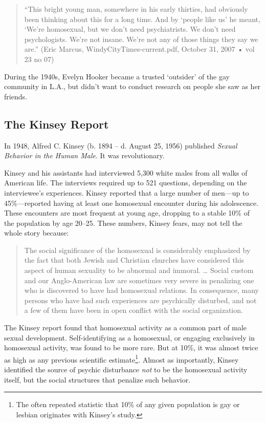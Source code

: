 \begin{refsection}
\begin{quote}

“This bright young man, somewhere in his early thirties, had obviously been thinking about this for a long time. And by ‘people like us’ he meant, ‘We’re homosexual, but we don’t need psychiatrists. We don’t need psychologists. We’re not insane. We’re not any of those things they say we are.” (Eric Marcus, WindyCityTimes-current.pdf, October 31, 2007 • vol 23 no 07)
\end{quote}

During the 1940s, Evelyn Hooker became a trusted `outsider' of the gay community in L.A., but didn't want to conduct research on people she saw as her friends.

\subsection{The Kinsey Report}
\label{thekinseyreport}

In 1948, Alfred C. Kinsey (b. 1894 – d. August 25, 1956) published \emph{Sexual Behavior in the Human Male}. It was revolutionary.

Kinsey and his assistants had interviewed 5,300 white males from all walks of American life. The interviews required up to 521 questions, depending on the interviewee’s experiences. Kinsey reported that a large number of men—up to 45\%—reported having at least one homosexual encounter during his adolescence. These encounters are most frequent at young age, dropping to a stable 10\% of the population by age 20--25. These numbers, Kinsey fears, may not tell the whole story because:

\begin{quote}

The social significance of the homosexual is considerably emphasized by the fact that both Jewish and Christian churches have considered this aspect of human sexuality to be abnormal and immoral. … Social custom and our Anglo-American law are sometimes very severe in penalizing one who is discovered to have had homosexual relations. In consequence, many persons who have had such experiences are psychically disturbed, and not a few of them have been in open conflict with the social organization. ~\citep[p. 610]{Kinsey:1998ur}
\end{quote}

The Kinsey report found that homosexual activity as a common part of male sexual development. Self-identifying as a homosexual, or engaging exclusively in homosexual activity, was found to be more rare. But at 10\%, it was almost twice as high as any previous scientific estimate\footnote{The often repeated statistic that 10\% of any given population is gay or lesbian originates with Kinsey’s study.}. Almost as importantly, Kinsey identified the source of psychic disturbance \emph{not} to be the homosexual activity itself, but the social structures that penalize such behavior.


\end{refsection}
